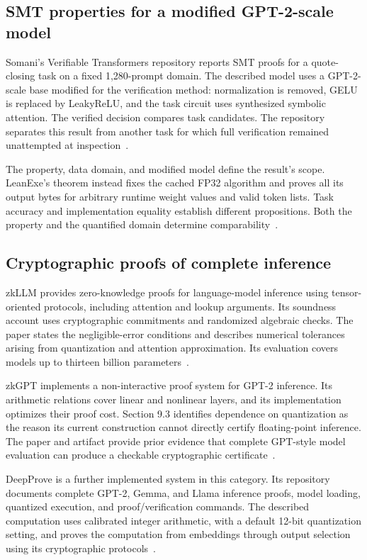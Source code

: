 \subsection{SMT properties for a modified GPT-2-scale model}

Somani's Verifiable Transformers repository reports SMT proofs for a quote-closing task on a fixed 1,280-prompt domain.  The described model uses a GPT-2-scale base modified for the verification method: normalization is removed, GELU is replaced by LeakyReLU, and the task circuit uses synthesized symbolic attention.  The verified decision compares task candidates.  The repository separates this result from another task for which full verification remained unattempted at inspection~\cite{lit-somani}.

The property, data domain, and modified model define the result's scope.  LeanExe's theorem instead fixes the cached FP32 algorithm and proves all its output bytes for arbitrary runtime weight values and valid token lists.  Task accuracy and implementation equality establish different propositions.  Both the property and the quantified domain determine comparability~\cite{lit-somani}.

\subsection{Cryptographic proofs of complete inference}

zkLLM provides zero-knowledge proofs for language-model inference using tensor-oriented protocols, including attention and lookup arguments.  Its soundness account uses cryptographic commitments and randomized algebraic checks.  The paper states the negligible-error conditions and describes numerical tolerances arising from quantization and attention approximation.  Its evaluation covers models up to thirteen billion parameters~\cite{lit-zkllm}.

zkGPT implements a non-interactive proof system for GPT-2 inference.  Its arithmetic relations cover linear and nonlinear layers, and its implementation optimizes their proof cost.  Section 9.3 identifies dependence on quantization as the reason its current construction cannot directly certify floating-point inference.  The paper and artifact provide prior evidence that complete GPT-style model evaluation can produce a checkable cryptographic certificate~\cite{lit-zkgpt}.

DeepProve is a further implemented system in this category.  Its repository documents complete GPT-2, Gemma, and Llama inference proofs, model loading, quantized execution, and proof/verification commands.  The described computation uses calibrated integer arithmetic, with a default 12-bit quantization setting, and proves the computation from embeddings through output selection using its cryptographic protocols~\cite{lit-deepprove}.

